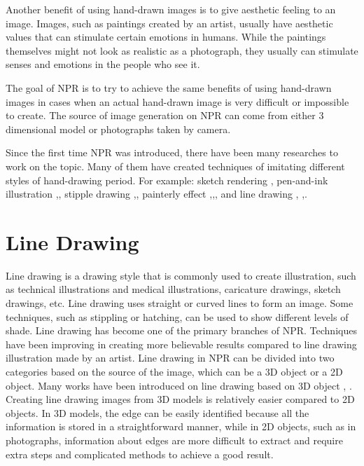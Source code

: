 Another benefit of using hand-drawn images is to give aesthetic feeling to an image. Images, such as paintings created by an artist, usually have aesthetic values that can stimulate certain emotions in humans. While the paintings themselves might not look as realistic as a photograph, they usually can stimulate senses and emotions in the people who see it.

The goal of NPR is to try to achieve the same benefits of using hand-drawn images in cases when an actual hand-drawn image is very difficult or impossible to create. The source of image generation on NPR can come from either 3 dimensional model or photographs taken by camera.

Since the first time NPR was introduced, there have been many researches to work on the topic. Many of them have created techniques of imitating different styles of hand-drawing period. For example: sketch rendering \cite{strothotte94}, pen-and-ink illustration \cite{winkenbach94},\cite{salisbury94}, stipple drawing \cite{secord02},\cite{deussen00}, painterly effect \cite{litwinowicz97},\cite{hertzmann98},\cite{hays04}, and line drawing \cite{decarlo03}, \cite{sousa03},\cite{kang07}.


\section{Line Drawing} 
Line drawing is a drawing style that is commonly used to create illustration, such as technical illustrations and medical illustrations, caricature drawings, sketch drawings, etc. Line drawing uses straight or curved lines to form an image. Some techniques, such as stippling or hatching, can be used to show different levels of shade. Line drawing has become one of the primary branches of NPR. Techniques have been improving in creating more believable results compared to line drawing illustration made by an artist. Line drawing in NPR can be divided into two categories based on the source of the image, which can be a 3D object or a 2D object. Many works have been introduced on line drawing based on 3D object \cite{decarlo03}, \cite{sousa03}. Creating line drawing images from 3D models is relatively easier compared to 2D objects. In 3D models, the edge can be easily identified because all the information is stored in a straightforward manner, while in 2D objects, such as in photographs, information about edges are more difficult to extract and require extra steps and complicated methods to achieve a good result.

